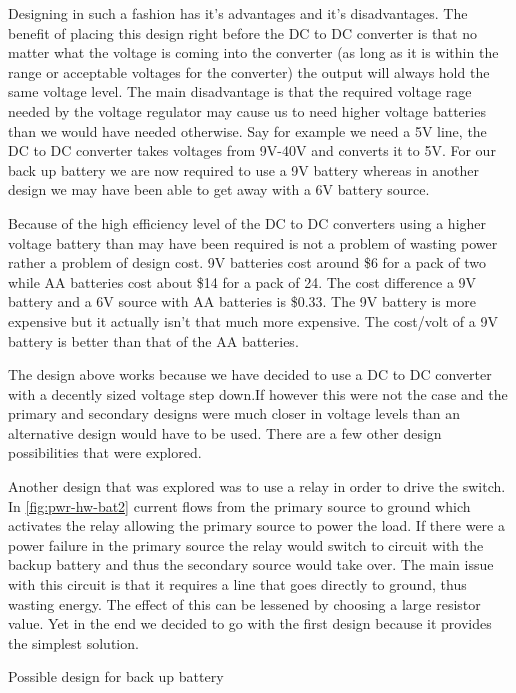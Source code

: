 Designing in such a fashion has it{}'s advantages and it{}'s disadvantages. The
benefit of placing this design right before the DC to DC converter is that no
matter what the voltage is coming into the converter (as long as it is within
the range or acceptable voltages for the converter) the output will always hold
the same voltage level. The main disadvantage is that the required voltage rage
needed by the voltage regulator may cause us to need higher voltage batteries
than we would have needed otherwise. Say for example we need a 5V line, the DC
to DC converter takes voltages from 9V{}-40V and converts it to 5V. For our
back up battery we are now required to use a 9V battery whereas in another
design we may have been able to get away with a 6V battery source.

Because of the high efficiency level of the DC to DC converters using a higher
voltage battery than may have been required is not a problem of wasting power
rather a problem of design cost. 9V batteries cost around \$6 for a pack of two
while AA batteries cost about \$14 for a pack of 24. The cost difference a 9V
battery and a 6V source with AA batteries is \$0.33. The 9V battery is more
expensive but it actually isn{}'t that much more expensive. The cost/volt of a
9V battery is better than that of the AA batteries.

The design above works because we have decided to use a DC to DC converter with
a decently sized voltage step down.If however this were not the case and the
primary and secondary designs were much closer in voltage levels than an
alternative design would have to be used. There are a few other design
possibilities that were explored.

Another design that was explored was to use a relay in order to drive the
switch. In \autoref{fig:pwr-hw-bat2} current flows from the primary source to
ground which activates the relay allowing the primary source to power the load.
If there were a power failure in the primary source the relay would switch to
circuit with the backup battery and thus the secondary source would take over.
The main issue with this circuit is that it requires a line that goes directly
to ground, thus wasting energy. The effect of this can be lessened by choosing
a large resistor value. Yet in the end we decided to go with the first design
because it provides the simplest solution.

{Possible design for back up battery\protect\cite{link16}}

